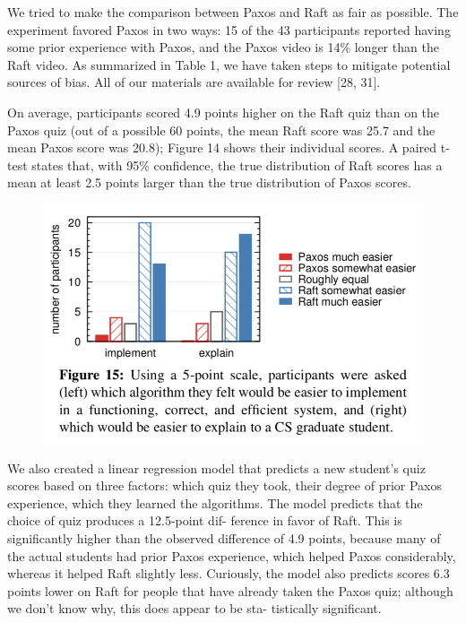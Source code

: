 \documentclass[journal]{IEEEtran}
\begin{document}
We tried to make the comparison between Paxos and Raft as fair as possible. The experiment favored Paxos in two ways: 15 of the 43 participants reported having some prior experience with Paxos, and the Paxos video is 14\% longer than the Raft video. As summarized in Table 1, we have taken steps to mitigate potential sources of bias. All of our materials are available for review [28, 31].

On average, participants scored 4.9 points higher on the Raft quiz than on the Paxos quiz (out of a possible 60 points, the mean Raft score was 25.7 and the mean Paxos score was 20.8); Figure 14 shows their individual scores. A paired t-test states that, with 95\% confidence, the true distribution of Raft scores has a mean at least 2.5 points larger than the true distribution of Paxos scores.

\begin{figure}[htbp]
\begin{center}
\includegraphics[width=1\linewidth]{./fig15.png}
\end{center}
\end{figure}
We also created a linear regression model that predicts a new student’s quiz scores based on three factors: which quiz they took, their degree of prior Paxos experience,  which they learned the algorithms. The model predicts that the choice of quiz produces a 12.5-point dif- ference in favor of Raft. This is significantly higher than the observed difference of 4.9 points, because many of the actual students had prior Paxos experience, which helped Paxos considerably, whereas it helped Raft slightly less. Curiously, the model also predicts scores 6.3 points lower on Raft for people that have already taken the Paxos quiz; although we don’t know why, this does appear to be sta- tistically significant.
\end{document}
